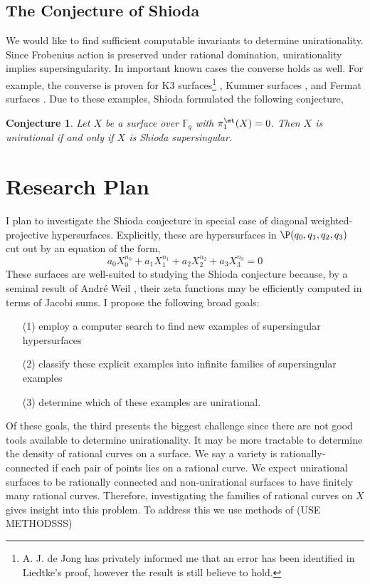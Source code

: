 \documentclass[12pt]{amsart}
\newtheorem*{conj}{Conjecture}
\begin{document}
\subsection*{The Conjecture of Shioda}

We would like to find sufficient computable invariants to determine unirationality. Since Frobenius action is preserved under rational domination, unirationality implies supersingularity. In important known cases the converse holds as well. For example, the converse is proven for K3 surfaces\footnote{A. J. de Jong has privately informed me that an error has been identified in Liedtke's proof, however the result is still believe to hold.} \cite{liedtke}, Kummer surfaces \cite{shioda_some_results},  and Fermat surfaces \cite{shioda_on_fermat}. Due to these examples, Shioda formulated \cite{shioda_some_results} the following conjecture,
\begin{conj}
Let $X$ be a surface over $\mathbb{F}_q$ with $\pi_1^{\et}(X) = 0$. Then $X$ is unirational if and only if $X$ is Shioda supersingular.
\end{conj}

\section*{Research Plan}

I plan to investigate the Shioda conjecture in special case of diagonal weighted-projective hypersurfaces. Explicitly, these are hypersurfaces in $\P(q_0, q_1, q_2, q_3)$ cut out by an equation of the form,
\[ a_0 X_0^{n_0} + a_1 X_1^{n_1} + a_2 X_2^{n_2} + a_3 X_3^{n_3} = 0 \]
These surfaces are well-suited to studying the Shioda conjecture because, by a seminal result of Andr\'{e} Weil \cite{weil_counting}, their zeta functions may be efficiently computed in terms of Jacobi sums. I propose the following broad goals:
\begin{enumerate}
\item[(1)] employ a computer search to find new examples of supersingular hypersurfaces
\item[(2)] classify these explicit examples into infinite families of supersingular examples
\item[(3)] determine which of these examples are unirational.
\end{enumerate}
Of these goals, the third presents the biggest challenge since there are not good tools available to determine unirationality. It may be more tractable to determine the density of rational curves on a surface. We say a variety is rationally-connected if each pair of points lies on a rational curve. We expect unirational surfaces to be rationally connected and non-unirational surfaces to have finitely many rational curves. Therefore, investigating the families of rational curves on $X$ gives insight into this problem. To address this we use methods of (USE METHODSSS)
\end{document}
